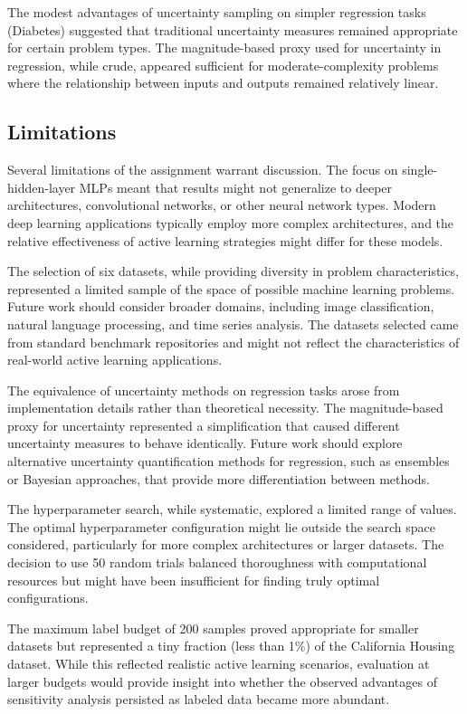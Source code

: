 \documentclass[conference]{IEEEtran}
\begin{document}
The modest advantages of uncertainty sampling on simpler regression tasks (Diabetes) suggested that traditional uncertainty measures remained appropriate for certain problem types. The magnitude-based proxy used for uncertainty in regression, while crude, appeared sufficient for moderate-complexity problems where the relationship between inputs and outputs remained relatively linear.

\subsection{Limitations}

Several limitations of the assignment warrant discussion. The focus on single-hidden-layer MLPs meant that results might not generalize to deeper architectures, convolutional networks, or other neural network types. Modern deep learning applications typically employ more complex architectures, and the relative effectiveness of active learning strategies might differ for these models.

The selection of six datasets, while providing diversity in problem characteristics, represented a limited sample of the space of possible machine learning problems. Future work should consider broader domains, including image classification, natural language processing, and time series analysis. The datasets selected came from standard benchmark repositories and might not reflect the characteristics of real-world active learning applications.

The equivalence of uncertainty methods on regression tasks arose from implementation details rather than theoretical necessity. The magnitude-based proxy for uncertainty represented a simplification that caused different uncertainty measures to behave identically. Future work should explore alternative uncertainty quantification methods for regression, such as ensembles or Bayesian approaches, that provide more differentiation between methods.

The hyperparameter search, while systematic, explored a limited range of values. The optimal hyperparameter configuration might lie outside the search space considered, particularly for more complex architectures or larger datasets. The decision to use 50 random trials balanced thoroughness with computational resources but might have been insufficient for finding truly optimal configurations.

The maximum label budget of 200 samples proved appropriate for smaller datasets but represented a tiny fraction (less than 1\%) of the California Housing dataset. While this reflected realistic active learning scenarios, evaluation at larger budgets would provide insight into whether the observed advantages of sensitivity analysis persisted as labeled data became more abundant.
\end{document}
